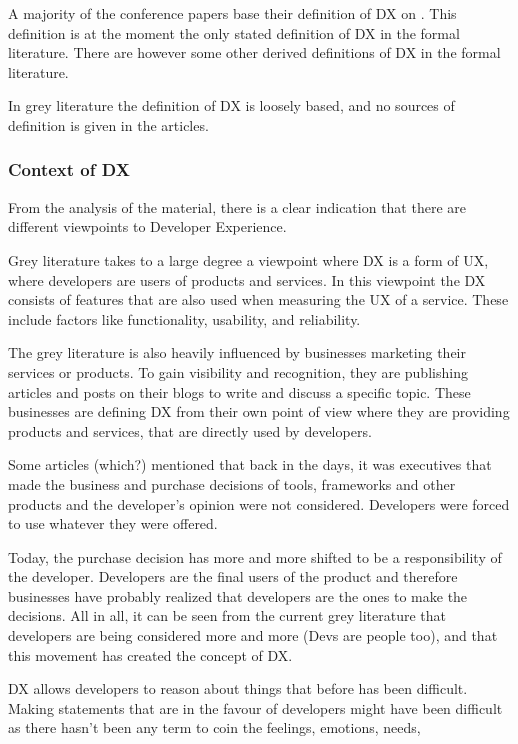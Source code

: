 \documentclass[english, 12pt, a4paper, sci, utf8, a-1b, online]{aaltothesis}
\begin{document}
A majority of the conference papers base their definition of DX on \cite{fagerholm-dx-concept-and-definition}. This definition is at the moment the only stated definition of DX in the formal literature. There are however some other derived definitions of DX in the formal literature.

In grey literature the definition of DX is loosely based, and no sources of definition is given in the articles.    

\subsubsection{Context of DX}

From the analysis of the material, there is a clear indication that there are different viewpoints to Developer Experience.

Grey literature takes to a large degree a viewpoint where DX is a form of UX, where developers are users of products and services. In this viewpoint the DX consists of features that are also used when measuring the UX of a service. These include factors like functionality, usability, and reliability. 

The grey literature is also heavily influenced by businesses marketing their services or products. To gain visibility and recognition, they are publishing articles and posts on their blogs to write and discuss a specific topic. These businesses are defining DX from their own point of view where they are providing products and services, that are directly used by developers. 

Some articles (which?) mentioned that back in the days, it was executives that made the business and purchase decisions of tools, frameworks and other products and the developer's opinion were not considered. Developers were forced to use whatever they were offered.  

Today, the purchase decision has more and more shifted to be a responsibility of the developer. Developers are the final users of the product and therefore businesses have probably realized that developers are the ones to make the decisions. All in all, it can be seen from the current grey literature that developers are being considered more and more (Devs are people too), and that this movement has created the concept of DX.

DX allows developers to reason about things that before has been difficult. Making statements that are in the favour of developers might have been difficult as there hasn't been any term to coin the feelings, emotions, needs, 
\end{document}
